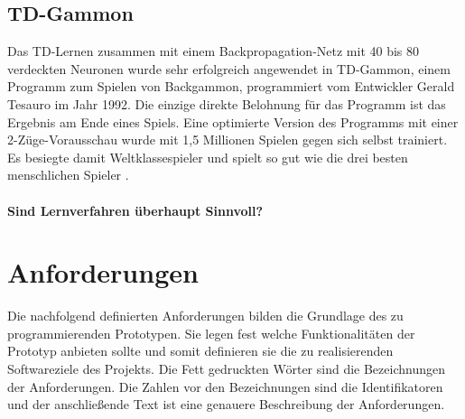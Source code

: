 \subsection{TD-Gammon}
Das TD-Lernen zusammen mit einem Backpropagation-Netz mit 40 bis 80 verdeckten Neuronen wurde sehr erfolgreich angewendet in TD-Gammon, einem Programm zum Spielen von Backgammon, programmiert vom Entwickler Gerald Tesauro im Jahr 1992. Die einzige direkte Belohnung für das Programm ist das Ergebnis am Ende eines Spiels. Eine optimierte Version des Programms mit einer 2-Züge-Vorausschau wurde mit 1,5 Millionen Spielen gegen sich selbst trainiert. Es besiegte damit Weltklassespieler und spielt so gut wie die drei besten menschlichen Spieler \cite[304]{Ertel}.  

\paragraph{Sind Lernverfahren überhaupt Sinnvoll?}

\section{Anforderungen}
\label{sec:Anforderungen}
Die nachfolgend definierten Anforderungen bilden die Grundlage des zu programmierenden Prototypen. Sie legen fest welche Funktionalitäten der Prototyp anbieten sollte und somit definieren sie die zu realisierenden Softwareziele des Projekts. Die Fett gedruckten Wörter sind die Bezeichnungen der Anforderungen. Die Zahlen vor den Bezeichnungen sind die Identifikatoren und der anschließende Text ist eine genauere Beschreibung der Anforderungen. \\


